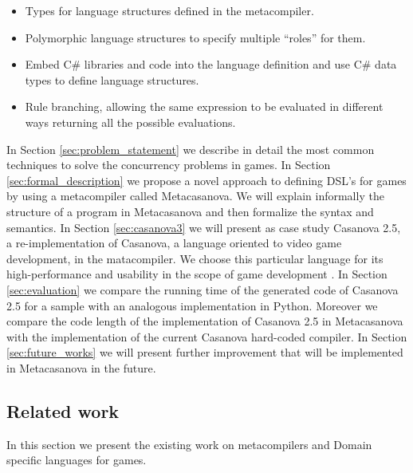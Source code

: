 \begin{itemize}
	\item Types for language structures defined in the metacompiler.
	\item Polymorphic language structures to specify multiple ``roles'' for them.
	\item Embed C\# libraries and code into the language definition and use C\# data types to define language structures.
	\item Rule branching, allowing the same expression to be evaluated in different ways returning all the possible evaluations.
\end{itemize}

In Section \ref{sec:problem_statement} we describe in detail the most
common techniques to solve the concurrency problems in games. In
Section \ref{sec:formal_description} we propose a novel approach to
defining DSL's for games by using a metacompiler called Metacasanova.
We will explain informally the structure of a program in Metacasanova
and then formalize the syntax and semantics. In Section
\ref{sec:casanova3} we will present as case study Casanova 2.5, a
re-implementation of Casanova, a language oriented to video game
development, in the matacompiler. We choose this particular language
for its high-performance and usability in the scope of game
development \cite{CASANOVA2_PAPER}. In Section \ref{sec:evaluation} we
compare the running time of the generated code of Casanova 2.5 for a
sample with an analogous implementation in Python. Moreover we compare
the code length of the implementation of Casanova 2.5 in Metacasanova
with the implementation of the current Casanova hard-coded compiler.
In Section \ref{sec:future_works} we will present further improvement
that will be implemented in Metacasanova in the future.

\subsection{Related work}
In this section we present the existing work on metacompilers and
Domain specific languages for games.

